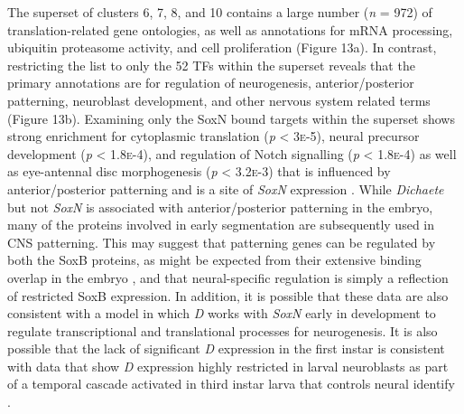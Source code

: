 \documentclass[withindex,glossary]{cam-thesis}
\begin{document}
The superset of clusters 6, 7, 8, and 10 contains a large number
(\emph{n} = 972) of translation-related gene ontologies, as well as
annotations for mRNA processing, ubiquitin proteasome activity, and cell
proliferation (Figure 13a). In contrast, restricting the list to only
the 52 TFs within the superset reveals that the primary annotations are
for regulation of neurogenesis, anterior/posterior patterning,
neuroblast development, and other nervous system related terms (Figure
13b). Examining only the SoxN bound targets within the superset shows
strong enrichment for cytoplasmic translation (\emph{p} \textless{}
3\textsc{e}-5), neural precursor development (\emph{p} \textless{} 1.8\textsc{e}-4), and
regulation of Notch signalling (\emph{p} \textless{} 1.8\textsc{e}-4) as well as
eye-antennal disc morphogenesis (\emph{p} \textless{} 3.2\textsc{e}-3) that is
influenced by anterior/posterior patterning 
and is a site of \emph{SoxN} expression . While
\emph{Dichaete} but not \emph{SoxN} is associated with
anterior/posterior patterning in the embryo, many of the proteins
involved in early segmentation are subsequently used in CNS patterning.
This may suggest that patterning genes can be regulated by both the SoxB
proteins, as might be expected from their extensive binding overlap in
the embryo , and that neural-specific regulation
is simply a reflection of restricted SoxB expression. In addition, it is
possible that these data are also consistent with a model in which
\emph{D} works with \emph{SoxN} early in development to regulate
transcriptional and translational processes for neurogenesis. It is also
possible that the lack of significant \emph{D} expression in the first
instar is consistent with data that show \emph{D} expression highly
restricted in larval neuroblasts as part of a temporal cascade activated
in third instar larva that controls neural identify .
\end{document}
